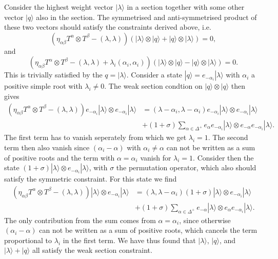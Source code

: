 Consider the highest weight vector $|\lambda\rangle$ in a section together with some other vector $|q\rangle$ also in the section. The symmetrised and anti-symmetrised product of these two vectors should satisfy the constraints derived above, i.e.\
\begin{equation}\label{eq:SectSym}
    \left(\eta_{\alpha\beta}T^\alpha\otimes T^\beta-(\lambda,\lambda)\right)\left(|\lambda\rangle\otimes|q\rangle+|q\rangle\otimes|\lambda\rangle\right)=0,
\end{equation}
and 
\begin{equation}
    \left(\eta_{\alpha\beta}T^\alpha\otimes T^\beta-(\lambda,\lambda)+\lambda_i(\alpha_i,\alpha_i)\right)\left(|\lambda\rangle\otimes|q\rangle-|q\rangle\otimes|\lambda\rangle\right)=0.
\end{equation}
This is trivially satisfied by the $q=|\lambda\rangle$. Consider a state $|q\rangle = e_{-\alpha_i}|\lambda\rangle$ with $\alpha_i$ a positive simple root with $\lambda_i\neq 0$. The weak section condtion on $|q\rangle\otimes|q\rangle$ then gives 
\begin{equation}
    \begin{aligned}
    \left(\eta_{\alpha\beta}T^\alpha\otimes T^\beta-(\lambda,\lambda)\right)e_{-\alpha_i}|\lambda\rangle \otimes e_{-\alpha_i}|\lambda\rangle &= (\lambda-\alpha_i,\lambda-\alpha_i)e_{-\alpha_i}|\lambda\rangle\otimes e_{-\alpha_i}|\lambda\rangle \\
    &+(1+\sigma)\sum_{\alpha\in \Delta^+}e_\alpha e_{-\alpha_i}|\lambda\rangle\otimes e_{-\alpha}e_{-\alpha_i}|\lambda\rangle.
    \end{aligned}
\end{equation}
The first term has to vanish seperately from which we get $\lambda_i=1$. The second term then also vanish since $(\alpha_i-\alpha)$ with $\alpha_i\neq \alpha$ can not be written as a sum of positive roots and the term with $\alpha=\alpha_i$ vanish for $\lambda_i=1$. Consider then the state $(1+\sigma)|\lambda\rangle\otimes e_{-\alpha_i}|\lambda\rangle$, with $\sigma$ the permutation operator, which also should satisfy the symmetric constraint. For this state we find 
\begin{equation}
    \begin{aligned}
    \left(\eta_{\alpha\beta}T^\alpha\otimes T^\beta-(\lambda,\lambda)\right)|\lambda\rangle \otimes e_{-\alpha_i}|\lambda\rangle &= (\lambda,\lambda-\alpha_i)(1+\sigma)|\lambda\rangle\otimes e_{-\alpha_i}|\lambda\rangle\\
    &+(1+\sigma)\sum_{\alpha\in\Delta^+}e_{-\alpha}|\lambda\rangle\otimes e_{\alpha}e_{-\alpha_i}|\lambda\rangle. 
    \end{aligned}
\end{equation}
The only contribution from the sum comes from $\alpha=\alpha_i$, since otherwise $(\alpha_i-\alpha)$ can not be written as a sum of positive roots, which cancels the term proportional to $\lambda_i$ in the first term. We have thus found that $|\lambda\rangle$, $|q\rangle$, and $|\lambda\rangle+|q\rangle$ all satisfy the weak section constraint. 

